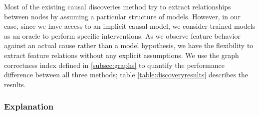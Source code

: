 \documentclass{article}
\begin{document}

Most of the existing causal discoveries method try to extract relationships between nodes by assuming a particular structure of models. 
However, in our case, since we have access to an implicit causal model, we consider trained models as an oracle to perform specific interventions.
As we observe feature behavior against an actual cause rather than a model hypothesis, we have the flexibility to extract feature relations without any explicit assumptions.
We use the graph correctness index defined in \ref{subsec:graphs} to quantify the performance difference between all three methods; table \ref{table:discoveryresults} describes the results. 

\subsubsection{Explanation}

\end{document}
